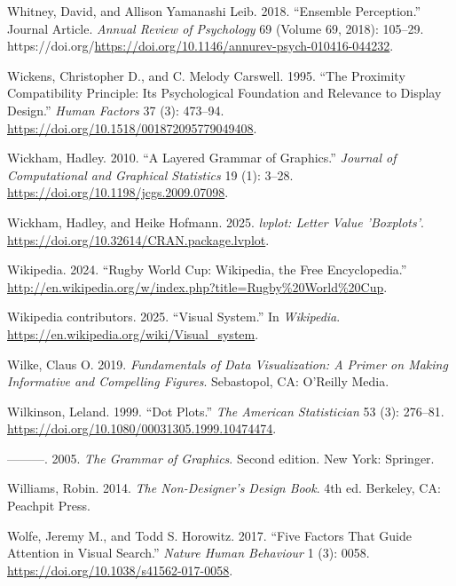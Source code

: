\documentclass[
  letterpaper,
  DIV=11,
  numbers=noendperiod]{scrreprt}
\newlength{\cslhangindent}
\newenvironment{CSLReferences}[2] %
 {\begin{list}{}{%
  \setlength{\itemindent}{0pt}
  \setlength{\leftmargin}{0pt}
  \setlength{\parsep}{0pt}
  \ifodd #1
   \setlength{\leftmargin}{\cslhangindent}
   \setlength{\itemindent}{-1\cslhangindent}
  \fi
  \setlength{\itemsep}{#2\baselineskip}}}
 {\end{list}}
\begin{document}
\begin{CSLReferences}{1}{0}
Whitney, David, and Allison Yamanashi Leib. 2018. {``Ensemble
Perception.''} Journal Article. \emph{Annual Review of Psychology} 69
(Volume 69, 2018): 105--29.
https://doi.org/\url{https://doi.org/10.1146/annurev-psych-010416-044232}.

Wickens, Christopher D., and C. Melody Carswell. 1995. {``The Proximity
Compatibility Principle: Its Psychological Foundation and Relevance to
Display Design.''} \emph{Human Factors} 37 (3): 473--94.
\url{https://doi.org/10.1518/001872095779049408}.

Wickham, Hadley. 2010. {``A Layered Grammar of Graphics.''}
\emph{Journal of Computational and Graphical Statistics} 19 (1): 3--28.
\url{https://doi.org/10.1198/jcgs.2009.07098}.

Wickham, Hadley, and Heike Hofmann. 2025. \emph{{lvplot}: Letter Value
'Boxplots'}. \url{https://doi.org/10.32614/CRAN.package.lvplot}.

Wikipedia. 2024. {``{Rugby World Cup}: {W}ikipedia{,} the Free
Encyclopedia.''}
\url{http://en.wikipedia.org/w/index.php?title=Rugby\%20World\%20Cup}.

Wikipedia contributors. 2025. {``Visual System.''} In \emph{Wikipedia}.
\url{https://en.wikipedia.org/wiki/Visual_system}.

Wilke, Claus O. 2019. \emph{Fundamentals of Data Visualization: A Primer
on Making Informative and Compelling Figures}. Sebastopol, CA: O'Reilly
Media.

Wilkinson, Leland. 1999. {``Dot Plots.''} \emph{The American
Statistician} 53 (3): 276--81.
\url{https://doi.org/10.1080/00031305.1999.10474474}.

---------. 2005. \emph{The Grammar of Graphics}. Second edition. New
York: Springer.

Williams, Robin. 2014. \emph{The Non-Designer's Design Book}. 4th ed.
Berkeley, CA: Peachpit Press.

Wolfe, Jeremy M., and Todd S. Horowitz. 2017. {``Five Factors That Guide
Attention in Visual Search.''} \emph{Nature Human Behaviour} 1 (3):
0058. \url{https://doi.org/10.1038/s41562-017-0058}.


\end{CSLReferences}
\end{document}
